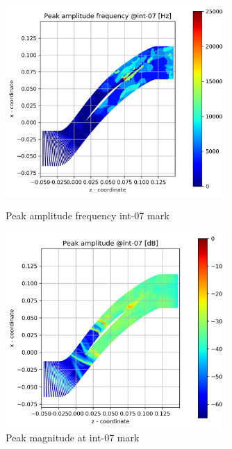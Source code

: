 \begin{figure}[ht]
  \centering
  \includegraphics[width=0.75\textwidth]{Figures/int-07-peak-freq.png}
  \caption{Peak amplitude frequency int-07 mark} \label{int-07-peak-freq}
  
  \vspace*{\floatsep}%

  \includegraphics[width=0.75\textwidth]{Figures/int-07-peak-mag.png}
  \caption{Peak magnitude at int-07 mark} \label{int-07-peak-mag}
\end{figure}

